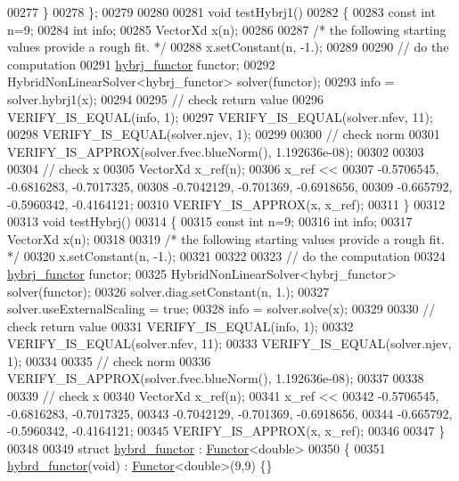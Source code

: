 \begin{DoxyCode}
00277     \}
00278 \};
00279 
00280 
00281 \textcolor{keywordtype}{void} testHybrj1()
00282 \{
00283   \textcolor{keyword}{const} \textcolor{keywordtype}{int} n=9;
00284   \textcolor{keywordtype}{int} info;
00285   VectorXd x(n);
00286 
00287   \textcolor{comment}{/* the following starting values provide a rough fit. */}
00288   x.setConstant(n, -1.);
00289 
00290   \textcolor{comment}{// do the computation}
00291   \hyperlink{structhybrj__functor}{hybrj\_functor} functor;
00292   HybridNonLinearSolver<hybrj\_functor> solver(functor);
00293   info = solver.hybrj1(x);
00294 
00295   \textcolor{comment}{// check return value}
00296   VERIFY\_IS\_EQUAL(info, 1);
00297   VERIFY\_IS\_EQUAL(solver.nfev, 11);
00298   VERIFY\_IS\_EQUAL(solver.njev, 1);
00299 
00300   \textcolor{comment}{// check norm}
00301   VERIFY\_IS\_APPROX(solver.fvec.blueNorm(), 1.192636e-08);
00302 
00303 
00304 \textcolor{comment}{// check x}
00305   VectorXd x\_ref(n);
00306   x\_ref <<
00307      -0.5706545,    -0.6816283,    -0.7017325,
00308      -0.7042129,     -0.701369,    -0.6918656,
00309      -0.665792,    -0.5960342,    -0.4164121;
00310   VERIFY\_IS\_APPROX(x, x\_ref);
00311 \}
00312 
00313 \textcolor{keywordtype}{void} testHybrj()
00314 \{
00315   \textcolor{keyword}{const} \textcolor{keywordtype}{int} n=9;
00316   \textcolor{keywordtype}{int} info;
00317   VectorXd x(n);
00318 
00319   \textcolor{comment}{/* the following starting values provide a rough fit. */}
00320   x.setConstant(n, -1.);
00321 
00322 
00323   \textcolor{comment}{// do the computation}
00324   \hyperlink{structhybrj__functor}{hybrj\_functor} functor;
00325   HybridNonLinearSolver<hybrj\_functor> solver(functor);
00326   solver.diag.setConstant(n, 1.);
00327   solver.useExternalScaling = \textcolor{keyword}{true};
00328   info = solver.solve(x);
00329 
00330   \textcolor{comment}{// check return value}
00331   VERIFY\_IS\_EQUAL(info, 1);
00332   VERIFY\_IS\_EQUAL(solver.nfev, 11);
00333   VERIFY\_IS\_EQUAL(solver.njev, 1);
00334 
00335   \textcolor{comment}{// check norm}
00336   VERIFY\_IS\_APPROX(solver.fvec.blueNorm(), 1.192636e-08);
00337 
00338 
00339 \textcolor{comment}{// check x}
00340   VectorXd x\_ref(n);
00341   x\_ref <<
00342      -0.5706545,    -0.6816283,    -0.7017325,
00343      -0.7042129,     -0.701369,    -0.6918656,
00344      -0.665792,    -0.5960342,    -0.4164121;
00345   VERIFY\_IS\_APPROX(x, x\_ref);
00346 
00347 \}
00348 
00349 \textcolor{keyword}{struct }\hyperlink{structhybrd__functor}{hybrd\_functor} : \hyperlink{struct_functor}{Functor}<double>
00350 \{
00351     \hyperlink{structhybrd__functor}{hybrd\_functor}(\textcolor{keywordtype}{void}) : \hyperlink{struct_functor}{Functor}<double>(9,9) \{\}

\end{DoxyCode}
